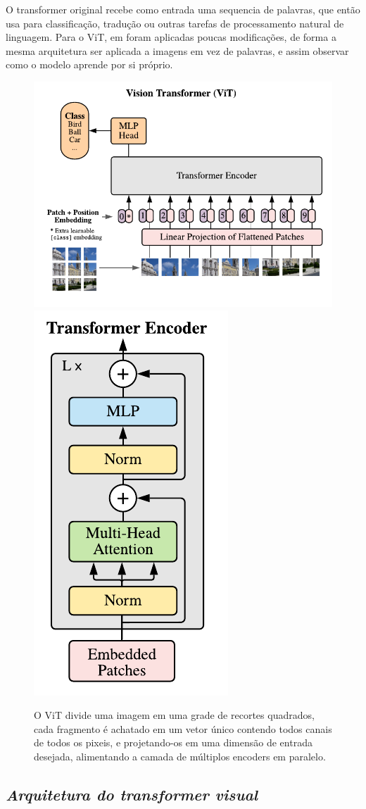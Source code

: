 O transformer original recebe como entrada uma sequencia de palavras, que então usa para classificação, tradução ou outras tarefas de processamento natural de linguagem. Para o ViT, em \cite{dosovitskiy2020image} foram aplicadas poucas modificações, de forma a mesma arquitetura ser aplicada a imagens em vez de palavras, e assim observar como o modelo aprende por si próprio.

\begin{figure}[!ht]
    \centering
    \includegraphics[width=0.65\columnwidth]{
        Imagens/vit.png
    }
    \includegraphics[width=0.34\columnwidth]{
        Imagens/encoder.png
    }
    \caption{O ViT divide uma imagem em uma grade de recortes quadrados, cada fragmento é achatado em um vetor único contendo todos canais de todos os pixeis, e projetando-os em uma dimensão de entrada desejada, alimentando a camada de múltiplos encoders em paralelo.}
    \label{fig:vit}
\end{figure}


\subsection{\textit{Arquitetura do transformer visual}}\label{sec:Cap2_vit}



